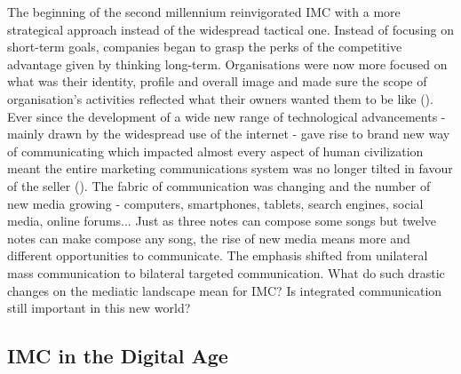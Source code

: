 \documentclass[12pt]{article}
\begin{document}
The beginning of the second millennium reinvigorated IMC with a more strategical approach instead of the widespread tactical one. Instead of focusing on short-term goals, companies began to grasp the perks of the competitive advantage given by thinking long-term. Organisations were now more focused on what was their identity, profile and overall image and made sure the scope of organisation's activities reflected what their owners wanted them to be like (\cite{holm}). Ever since the development of a wide new range of technological advancements - mainly drawn by the widespread use of the internet - gave rise to brand new way of communicating which impacted almost every aspect of human civilization meant the entire marketing communications system was no longer tilted in favour of the seller (\cite{kliatchko}). The fabric of communication was changing and the number of new media growing - computers, smartphones, tablets, search engines, social media, online forums...  Just as three notes can compose some songs but twelve notes can make compose any song, the rise of new media means more and different opportunities to communicate. The emphasis shifted from unilateral mass communication to bilateral targeted communication. What do such drastic changes on the mediatic landscape mean for IMC? Is integrated communication still important in this new world?

 \subsection{IMC in the Digital Age}\label{digitalage}
 
\end{document}
